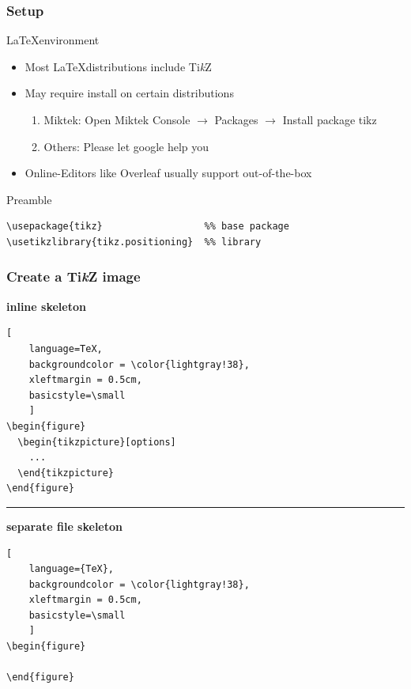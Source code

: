 \documentclass{beamer}
\newcommand{\tikzname}{Ti\textit{k}Z\xspace}
\begin{document}
\begin{frame}[fragile]
\frametitle{Setup}
\begin{block}{\LaTeX environment}
    \begin{itemize}
        \item Most \LaTeX distributions include \tikzname
        \item May require install on certain distributions
        \begin{enumerate}
            \item Miktek: Open Miktek Console \(\rightarrow\) Packages \(\rightarrow\) Install package tikz
            \item Others: Please let google help you
        \end{enumerate}
        \item Online-Editors like Overleaf usually support out-of-the-box
    \end{itemize}
\end{block}

\begin{block}{Preamble}
\begin{verbatim}
\usepackage{tikz}                  %% base package
\usetikzlibrary{tikz.positioning}  %% library
\end{verbatim}
\end{block}

\end{frame}


\begin{frame}[fragile]
\frametitle{Create a \tikzname image}
%
\textbf{inline skeleton}
\begin{lstlisting}[
    language=TeX,
    backgroundcolor = \color{lightgray!38},
    xleftmargin = 0.5cm,
    basicstyle=\small
    ]
\begin{figure}
  \begin{tikzpicture}[options]
    ...
  \end{tikzpicture}
\end{figure}
\end{lstlisting}
\hrule
\vspace{1em}
\textbf{separate file skeleton}
\begin{lstlisting}[
    language={TeX},
    backgroundcolor = \color{lightgray!38},
    xleftmargin = 0.5cm,
    basicstyle=\small
    ]
\begin{figure}
  
\end{figure}
\end{lstlisting}
\end{frame}
%
\end{document}
